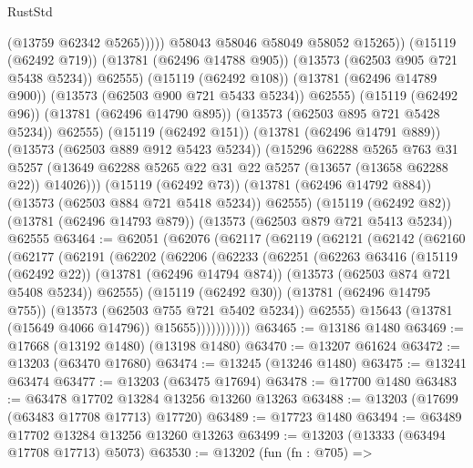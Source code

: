 \begin{lexlean}{RustStd}
\begin{coremodule}
                          (@13759 @62342 @5265)))))
                  @58043
                  @58046
                  @58049
                  @58052
                  @15265))
              (@15119 (@62492 @719))
              (@13781 (@62496 @14788 @905))
              (@13573 (@62503 @905 @721 @5438 @5234))
              @62555)
            (@15119 (@62492 @108))
            (@13781 (@62496 @14789 @900))
            (@13573 (@62503 @900 @721 @5433 @5234))
            @62555)
          (@15119 (@62492 @96))
          (@13781 (@62496 @14790 @895))
          (@13573 (@62503 @895 @721 @5428 @5234))
          @62555)
        (@15119 (@62492 @151))
        (@13781 (@62496 @14791 @889))
        (@13573 (@62503 @889 @912 @5423 @5234))
        (@15296
          @62288
          @5265
          @763
          @31
          @5257
          (@13649 @62288 @5265 @22 @31 @22 @5257 (@13657 (@13658 @62288 @22)) @14026)))
      (@15119 (@62492 @73))
      (@13781 (@62496 @14792 @884))
      (@13573 (@62503 @884 @721 @5418 @5234))
      @62555)
    (@15119 (@62492 @82))
    (@13781 (@62496 @14793 @879))
    (@13573 (@62503 @879 @721 @5413 @5234))
    @62555
@63464 := @62051
    (@62076
      (@62117
        (@62119
          (@62121
            (@62142
              (@62160
                (@62177
                  (@62191
                    (@62202
                      (@62206
                        (@62233
                          (@62251
                            (@62263
                              @63416
                              (@15119 (@62492 @22))
                              (@13781 (@62496 @14794 @874))
                              (@13573 (@62503 @874 @721 @5408 @5234))
                              @62555)
                            (@15119 (@62492 @30))
                            (@13781 (@62496 @14795 @755))
                            (@13573 (@62503 @755 @721 @5402 @5234))
                            @62555)
                          @15643
                          (@13781 (@15649 @4066 @14796))
                          @15655)))))))))))
@63465 := @13186 @1480
@63469 := @17668 (@13192 @1480) (@13198 @1480)
@63470 := @13207 @61624
@63472 := @13203 (@63470 @17680)
@63474 := @13245 (@13246 @1480)
@63475 := @13241 @63474
@63477 := @13203 (@63475 @17694)
@63478 := @17700 @1480
@63483 := @63478 @17702 @13284 @13256 @13260 @13263
@63488 := @13203 (@17699 (@63483 @17708 @17713) @17720)
@63489 := @17723 @1480
@63494 := @63489 @17702 @13284 @13256 @13260 @13263
@63499 := @13203 (@13333 (@63494 @17708 @17713) @5073)
@63530 := @13202
    (fun (fn : @705) =>

\end{coremodule}
\end{lexlean}
